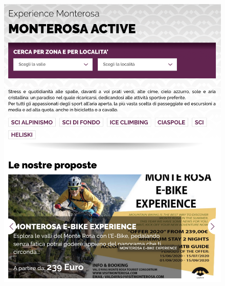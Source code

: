 \documentclass[a4paper, 11pt, parskip=half, headsepline]{scrreprt}
\begin{document}
\begin{figure}[H]
    \begin{minipage}[t]{0.5\textwidth}
        \centering
        \includegraphics[width=1\linewidth, keepaspectratio]{11-interaction-consistency}
        \caption{}
        \label{fig:interaction-consistency-01}
    \end{minipage}   
    \hspace*{\fill}
    \begin{minipage}[t]{0.5\textwidth}
        \centering

\end{minipage}
\end{figure}
\end{document}
